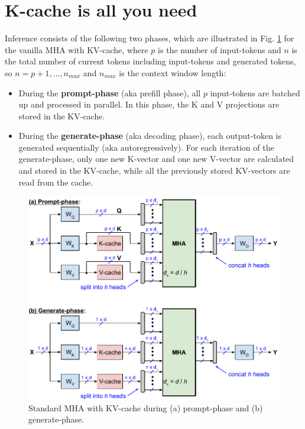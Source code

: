 \documentclass{article}
\begin{document}
\section{K-cache is all you need}
Inference consists of the following two phases, which are illustrated in Fig. \ref{fig2} for the vanilla MHA with KV-cache, where $p$ is the number of input-tokens and $n$ is the total number of current tokens including input-tokens and generated tokens, so $n = p+1, \ldots, n_{max}$ and $n_{max}$ is the context window length:
\begin{itemize}[topsep=-1pt, itemsep=-1pt]
  \item During the \textbf{prompt-phase} (aka prefill phase), all $p$ input-tokens are batched up and processed in parallel. In this phase, the K and V projections are stored in the KV-cache.
  \item During the \textbf{generate-phase} (aka decoding phase), each output-token is generated sequentially (aka autoregressively). For each iteration of the generate-phase, only one new K-vector and one new V-vector are calculated and stored in the KV-cache, while all the previously stored KV-vectors are read from the cache.
\end{itemize}
\begin{figure}[h!] \centering
  \includegraphics[scale=0.88]{../doc/fig/slimAttn_fig2.pdf}
  \caption{Standard MHA with KV-cache during (a) prompt-phase and (b) generate-phase.}
\label{fig2} \end{figure}
\end{document}
